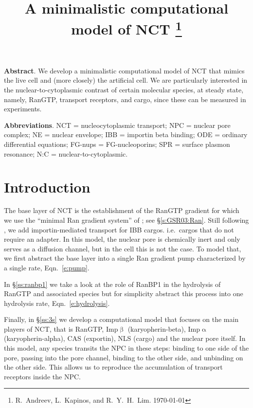 \documentclass[12pt,notitlepage]{article}
\title{%
A minimalistic computational model of NCT%
\thanks{%
R.~Andreev, L.~Kapinos, and R.~Y.~H.~Lim.
\today
\hfill
\tiny\color{lightgray}\hfill{\DTMnow}
}}
\date{}
\begin{document}
\maketitle

{
\small
\textbf{Abstract}.
%
We develop a minimalistic computational
model of 
NCT
that mimics
the live cell and (more closely) the artificial cell.
%
%
We are particularly
interested in 
the nuclear-to-cytoplasmic contrast
of 
certain molecular species,
at steady state,
namely,
RanGTP,
transport receptors,
and
cargo,
since these can be measured in experiments.
}


{
\small
\textbf{Abbreviations}.
%
NCT = nucleocytoplasmic transport;
NPC = nuclear pore complex;
NE = nuclear envelope;
IBB = importin beta binding; 
ODE = ordinary differential equations;
FG-nups = FG-nucleoporins;
SPR = surface plasmon resonance;
N:C = nuclear-to-cytoplasmic.
}

\section{Introduction}

%

The base layer of NCT is the establishment of 
the RanGTP gradient
for which we use the ``minimal Ran gradient system''
of \cite{GoerlichSeewaldRibbeck2003};
see \S\ref{s:GSR03:Ran}.
%
%
Still following \cite{GoerlichSeewaldRibbeck2003},
we add importin-mediated transport 
for IBB cargos.
%
i.e.~cargos that do not require an adapter.
%
%
%
In this model,
the nuclear pore is chemically inert 
and only serves as a diffusion channel,
but in the cell this is not the case.
%
To model that,
we first abstract
the base layer into a single
Ran gradient pump characterized
by a single rate, Eqn.~\ref{e:pump}. 

%

In \S\ref{ss:ranbp1} we take a look at the role
of RanBP1
in the hydrolysis of RanGTP
and associated species
but
for simplicity
abstract this process into 
one hydrolysis rate, Eqn.~\eqref{e:hydrolysis}.

%

Finally, in \S\ref{ss:3s}
we develop 
a computational model
that focuses
on the main players of NCT,
that is
{RanGTP},
{Imp$\upbeta$} (karyopherin-beta),
{Imp$\upalpha$} (karyopherin-alpha),
{CAS} (exportin),
{NLS} (cargo)
and
the nuclear pore itself.
%
%
%
In this model,
any species transits the NPC
in these steps:
binding to one side of the pore,
passing into the pore channel,
binding to the other side,
and unbinding on the other side.
%
%
This allows us
to reproduce the accumulation
of transport receptors
inside the NPC.
\end{document}
